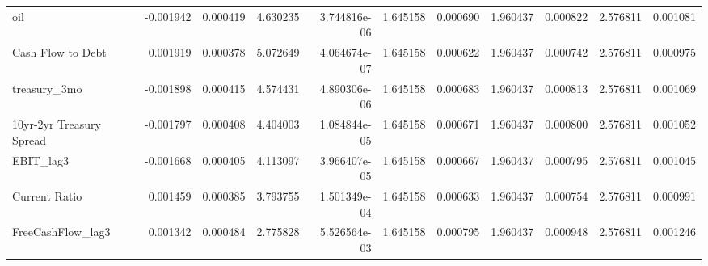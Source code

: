\documentclass[12pt,a4paper,english]{article}
\begin{document}
{{\begin{tabular}{@{}lrrrrrrrrrr@{}}
			oil                           & -0.001942                & 0.000419                    & 4.630235                  & 3.744816e-06                             & 1.645158                      & 0.000690                      & 1.960437                     & 0.000822                     & 2.576811                     & 0.001081                     \\
			Cash Flow to Debt             & 0.001919                 & 0.000378                    & 5.072649                  & 4.064674e-07                             & 1.645158                      & 0.000622                      & 1.960437                     & 0.000742                     & 2.576811                     & 0.000975                     \\
			treasury\_3mo                 & -0.001898                & 0.000415                    & 4.574431                  & 4.890306e-06                             & 1.645158                      & 0.000683                      & 1.960437                     & 0.000813                     & 2.576811                     & 0.001069                     \\
			10yr-2yr Treasury Spread      & -0.001797                & 0.000408                    & 4.404003                  & 1.084844e-05                             & 1.645158                      & 0.000671                      & 1.960437                     & 0.000800                     & 2.576811                     & 0.001052                     \\
			EBIT\_lag3                    & -0.001668                & 0.000405                    & 4.113097                  & 3.966407e-05                             & 1.645158                      & 0.000667                      & 1.960437                     & 0.000795                     & 2.576811                     & 0.001045                     \\
			Current Ratio                 & 0.001459                 & 0.000385                    & 3.793755                  & 1.501349e-04                             & 1.645158                      & 0.000633                      & 1.960437                     & 0.000754                     & 2.576811                     & 0.000991                     \\
			FreeCashFlow\_lag3            & 0.001342                 & 0.000484                    & 2.775828                  & 5.526564e-03                             & 1.645158                      & 0.000795                      & 1.960437                     & 0.000948                     & 2.576811                     & 0.001246                     \\

\end{tabular}}}
\end{document}
